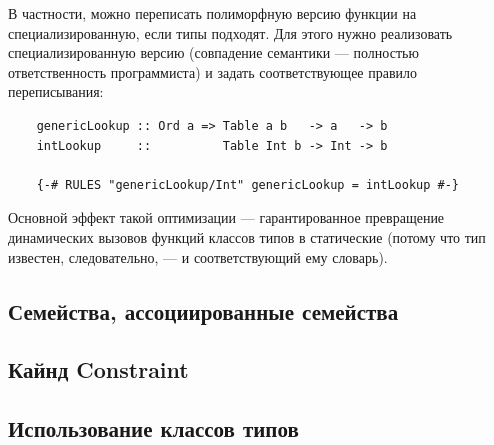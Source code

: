 В частности, можно переписать полиморфную версию функции на специализированную, если типы подходят.
Для этого нужно реализовать специализированную версию (совпадение семантики --- полностью ответственность программиста) и задать соответствующее правило переписывания:
\begin{verbatim}
    genericLookup :: Ord a => Table a b   -> a   -> b
    intLookup     ::          Table Int b -> Int -> b

    {-# RULES "genericLookup/Int" genericLookup = intLookup #-}
\end{verbatim}

Основной эффект такой оптимизации --- гарантированное превращение динамических вызовов функций классов типов в статические (потому что тип известен, следовательно, --- и соответствующий ему словарь).

\subsection{Семейства, ассоциированные семейства}




\subsection{Кайнд Constraint}






\cite{constraint-kind}






\cite{orchard2010haskell}


\subsection{Использование классов типов}

